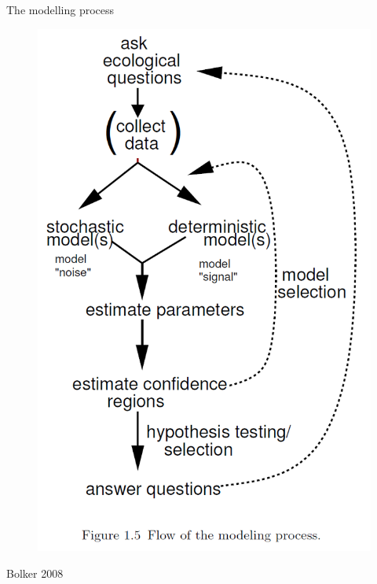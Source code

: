 \documentclass[10pt,ignorenonframetext,]{beamer}
\begin{document}
\begin{frame}{The modelling process}

\begin{figure}[htbp]
\centering
\includegraphics{images/modeling_process.png}
\caption{}
\end{figure}

Bolker 2008

\end{frame}
\end{document}
